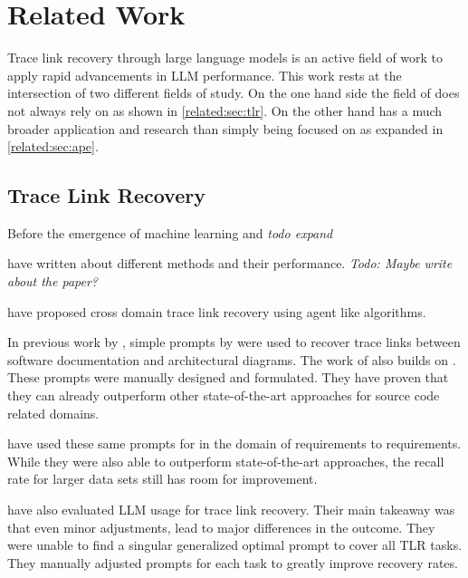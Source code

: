 \chapter{Related Work}
Trace link recovery through large language models is an active field of work to apply rapid advancements in LLM performance.
This work rests at the intersection of two different fields of study.
On the one hand side the field of \TLR does not always rely on \LLMs as shown in \autoref{related:sec:tlr}.
On the other hand \APE has a much broader application and research than simply being focused on \TLR as expanded in \autoref{related:sec:ape}.


\section{Trace Link Recovery}
\label{related:sec:tlr}

Before the emergence of machine learning and \LLMs \textit{todo expand}

 have written about different \IR methods and their performance. \textit{Todo: Maybe write about the paper?}


 have proposed cross domain trace link recovery using agent like algorithms. 



In previous work by , simple prompts by  were used to recover trace links between software documentation and architectural diagrams.
The work of \citeauthor{ewald2024RetrievalAugmentedLarge} also builds on .
These prompts were manually designed and formulated.
They have proven that they can already outperform other state-of-the-art approaches for source code related \TLR domains.

 have used these same prompts for \TLR in the domain of requirements to requirements.
While they were also able to outperform state-of-the-art approaches, the recall rate for larger data sets still has room for improvement.

 have also evaluated LLM usage for trace link recovery.
Their main takeaway was that even minor adjustments,  lead to major differences in the outcome.
They were unable to find a singular generalized optimal prompt to cover all TLR tasks.
They manually adjusted prompts for each task to greatly improve recovery rates.



